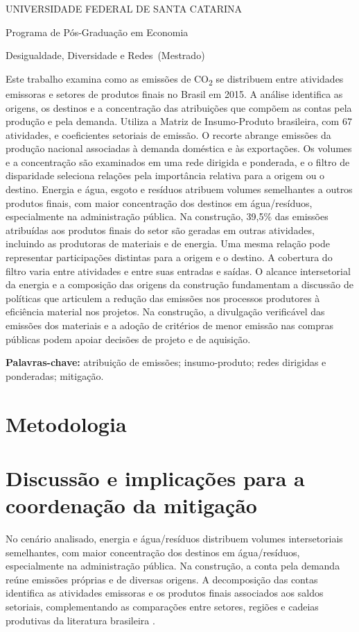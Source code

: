 \documentclass[11pt]{article}
\renewenvironment{abstract}{\par\medskip\noindent\textbf{\abstractname}\par\smallskip\small\setstretch{1}\noindent}{\par\medskip}
\newcommand{\instituicao}{UNIVERSIDADE FEDERAL DE SANTA CATARINA}
\newcommand{\departamento}{Programa de Pós-Graduação em Economia}
\newcommand{\curso}{Mestrado}
\newcommand{\disciplina}{Desigualdade, Diversidade e Redes}
\newcommand{\titulo}{Rede de emissões de CO\textsubscript{2} no Brasil}
\newcommand{\autor}{Gabriel Pincelli Cintra}
\newcommand{\local}{Florianópolis}
\newcommand{\dataentrega}{18 de outubro de 2026}
\newcommand{\imprimirtitulodois}{
\begin{center}
  {\small\MakeUppercase{\instituicao}\par}
  {\small \departamento\par}
  {\small \disciplina\ (\curso)\par}
  \vspace{1em}{\LARGE\bfseries \titulo\par}
  \vspace{0.7em}{\normalsize \autor\par}
  \vspace{0.3em}{\small \local, \dataentrega\par}
\end{center}
\vspace{0.4em}}
\begin{document}
\imprimirtitulodois
\thispagestyle{empty}
\begin{abstract}
Este trabalho examina como as emissões de CO\textsubscript{2} se distribuem entre atividades emissoras e setores de produtos finais no Brasil em 2015. A análise identifica as origens, os destinos e a concentração das atribuições que compõem as contas pela produção e pela demanda. Utiliza a Matriz de Insumo-Produto brasileira, com 67 atividades, e coeficientes setoriais de emissão. O recorte abrange emissões da produção nacional associadas à demanda doméstica e às exportações. Os volumes e a concentração são examinados em uma rede dirigida e ponderada, e o filtro de disparidade seleciona relações pela importância relativa para a origem ou o destino. Energia e água, esgoto e resíduos atribuem volumes semelhantes a outros produtos finais, com maior concentração dos destinos em água/resíduos, especialmente na administração pública. Na construção, 39,5\% das emissões atribuídas aos produtos finais do setor são geradas em outras atividades, incluindo as produtoras de materiais e de energia. Uma mesma relação pode representar participações distintas para a origem e o destino. A cobertura do filtro varia entre atividades e entre suas entradas e saídas. O alcance intersetorial da energia e a composição das origens da construção fundamentam a discussão de políticas que articulem a redução das emissões nos processos produtores à eficiência material nos projetos. Na construção, a divulgação verificável das emissões dos materiais e a adoção de critérios de menor emissão nas compras públicas podem apoiar decisões de projeto e de aquisição.
\end{abstract}
\noindent\textbf{Palavras-chave:} atribuição de emissões; insumo-produto; redes dirigidas e ponderadas; mitigação.

\clearpage

\clearpage
\section{Metodologia}



\clearpage

\clearpage
\section{Discussão e implicações para a coordenação da mitigação}

No cenário analisado, energia e água/resíduos distribuem volumes intersetoriais semelhantes, com maior concentração dos destinos em água/resíduos, especialmente na administração pública. Na construção, a conta pela demanda reúne emissões próprias e de diversas origens. A decomposição das contas identifica as atividades emissoras e os produtos finais associados aos saldos setoriais, complementando as comparações entre setores, regiões e cadeias produtivas da literatura brasileira \parencite{imori2015,sanguinetAzzoni2024,montoyaEtAl2026}.
\end{document}

